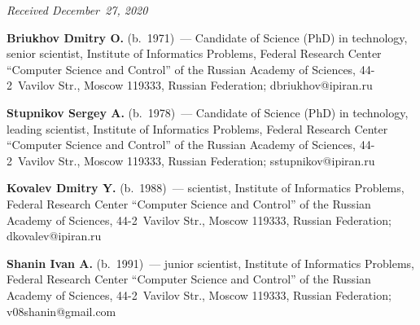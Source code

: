 \vspace*{-3pt}

  \hfill{\small\textit{Received December~27, 2020}}




\Contr

\noindent
\textbf{Briukhov Dmitry O.} (b.\ 1971)~--- Candidate of Science (PhD) in technology, senior 
scientist, Institute of Informatics Problems, Federal Research Center ``Computer Science and 
Control'' of the Russian Academy of Sciences, 44-2~Vavilov Str., Moscow 119333, Russian 
Federation; \mbox{dbriukhov@ipiran.ru}

\vspace*{3pt}

\noindent
\textbf{Stupnikov Sergey A.} (b.\ 1978)~--- Candidate of Science (PhD) in technology, leading 
scientist, Institute of Informatics Problems, Federal Research Center ``Computer Science and 
Control'' of the Russian Academy of Sciences, 44-2~Vavilov Str., Moscow 119333, Russian 
Federation; \mbox{sstupnikov@ipiran.ru}
    
\vspace*{3pt}

\noindent
    \textbf{Kovalev Dmitry Y.} (b.\ 1988)~--- scientist, Institute of Informatics 
Problems, Federal Research Center ``Computer Science and Control'' of the Russian 
Academy of Sciences, 44-2~Vavilov Str.,  Moscow 119333, Russian Federation; 
\mbox{dkovalev@ipiran.ru}
    
    
\vspace*{3pt}

\noindent
    \textbf{Shanin Ivan A.} (b.\ 1991)~--- junior scientist, Institute of Informatics 
Problems, Federal Research Center ``Computer Science and Control'' of the 
Russian Academy of Sciences, 44-2~Vavilov Str., Moscow 119333, Russian 
Federation; \mbox{v08shanin@gmail.com}


\label{end\stat}

\renewcommand{\bibname}{\protect\rm Литература}